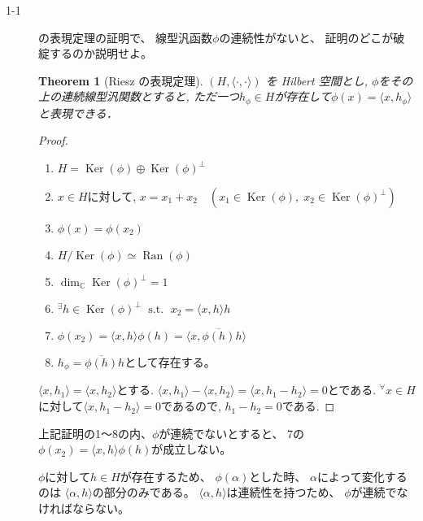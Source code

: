 \documentclass[12pt,b5paper]{ltjsarticle}
\newtheorem{theo}{Theorem}
\newcommand{\Ker}{\mathop{\mathrm{Ker}}\nolimits}
\newcommand{\Ran}{\mathop{\mathrm{Ran}}\nolimits}
\begin{document}
\hrulefill


\begin{description}
 \item[1-1]
             の表現定理の証明で、
            線型汎函数$\phi$の連続性がないと、
            証明のどこが破綻するのか説明せよ。

            \begin{theo}[Riesz の表現定理]
             $(H,\langle\cdot,\cdot\rangle)$ を Hilbert 空間とし,
             $\phi$をその上の連続線型汎関数とすると,
             ただ一つ$h_{\phi}\in H$が存在して$\phi(x)=\langle x,h_{\phi}\rangle$と表現できる．
            \end{theo}

            \begin{proof}
            \begin{enumerate}
             \item $H = \Ker(\phi) \oplus \Ker(\phi)^{\perp}$
             \item $x\in H$に対して, \; $x=x_{1}+x_{2} \quad (x_{1}\in\Ker(\phi) , \; x_{2}\in\Ker(\phi)^{\perp})$
             \item $\phi(x)=\phi(x_{2})$
             \item $H/\Ker(\phi) \simeq \Ran(\phi)$
             \item $\dim_{\mathbb{C}}\Ker(\phi)^{\perp} = 1$
             \item ${}^\exists h\in\Ker(\phi)^{\perp} \; \text{ s.t. } \; x_{2}=\langle x,h \rangle h$
             \item $\phi(x_{2}) = \langle x,h \rangle \phi(h) = \langle x, \overline{\phi(h)} h \rangle$
             \item $h_{\phi} = \overline{\phi(h)} h$として存在する。
            \end{enumerate}

            $\langle x,h_{1} \rangle = \langle x,h_{2} \rangle$とする.
            $\langle x,h_{1} \rangle - \langle x,h_{2} \rangle = \langle x,h_{1} - h_{2} \rangle=0$とである.
            ${}^\forall x \in H$に対して$\langle x,h_{1} - h_{2} \rangle=0$であるので,
            $h_{1}-h_{2}=0$である.
            \end{proof}

            \dotfill

            上記証明の1～8の内、$\phi$が連続でないとすると、
            7の$\phi(x_{2}) = \langle x,h \rangle \phi(h)$が成立しない。

            $\phi$に対して$h\in H$が存在するため、
            $\phi(\alpha)$とした時、
            $\alpha$によって変化するのは
            $\langle \alpha,h \rangle$の部分のみである。
            $\langle \alpha,h \rangle$は連続性を持つため、
            $\phi$が連続でなければならない。


\end{description}
\end{document}
